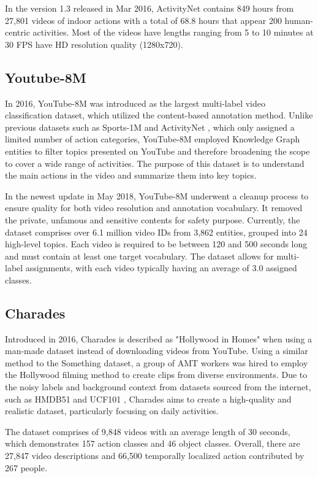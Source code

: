 \documentclass[a4paper]{article}
\begin{document}
In the version 1.3 released in Mar 2016, ActivityNet contains 849 hours from 27,801 videos of indoor actions with a total of 68.8 hours that appear 200 human-centric activities. Most of the videos have lengths ranging from 5 to 10 minutes at 30 FPS have HD resolution quality (1280x720). 
\subsection{Youtube-8M}
In 2016, YouTube-8M \cite{YouTube8M} was introduced as the largest multi-label video classification dataset, which utilized the content-based annotation method. Unlike previous datasets such as Sports-1M \cite{Sports1M} and ActivityNet \cite{ActivityNet}, which only assigned a limited number of action categories, YouTube-8M employed Knowledge Graph entities to filter topics presented on YouTube and therefore broadening the scope to cover a wide range of activities. The purpose of this dataset is to understand the main actions in the video and summarize them into key topics.

In the newest update in May 2018, YouTube-8M underwent a cleanup process to ensure quality for both video resolution and annotation vocabulary. It removed the private, unfamous and sensitive contents for safety purpose. Currently, the dataset comprises over 6.1 million video IDs from 3,862 entities, grouped into 24 high-level topics. Each video is required to be between 120 and 500 seconds long and must contain at least one target vocabulary. The dataset allows for multi-label assignments, with each video typically having an average of 3.0 assigned classes.

\subsection{Charades}
Introduced in 2016, Charades \cite{Charades} is described as "Hollywood in Homes" when using a man-made dataset instead of downloading videos from YouTube. Using a similar method to the Something \cite{somethingsomething} dataset, a group of AMT workers was hired to employ the Hollywood filming method to create clips from diverse environments. Due to the noisy labels and background context from datasets sourced from the internet, such as HMDB51 \cite{HMDB51} and UCF101 \cite{UCF101}, Charades aims to create a high-quality and realistic dataset, particularly focusing on daily activities.

The dataset comprises of 9,848 videos with an average length of 30 seconds, which demonstrates 157 action classes and 46 object classes. Overall, there are 27,847 video descriptions and 66,500 temporally localized action contributed by 267 people.
\end{document}
